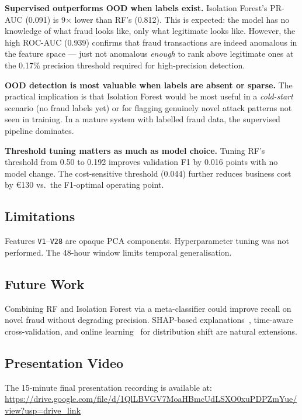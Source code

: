 \documentclass[conference]{IEEEtran}
\begin{document}
\textbf{Supervised outperforms OOD when labels exist.}
Isolation Forest's PR-AUC (0.091) is 9$\times$ lower than RF's (0.812).
This is expected: the model has no knowledge of what fraud looks like, only
what legitimate looks like. However, the high ROC-AUC (0.939) confirms that
fraud transactions are indeed anomalous in the feature space --- just not
anomalous \textit{enough} to rank above legitimate ones at the 0.17\% precision
threshold required for high-precision detection.

\textbf{OOD detection is most valuable when labels are absent or sparse.}
The practical implication is that Isolation Forest would be most useful in a
\textit{cold-start} scenario (no fraud labels yet) or for flagging genuinely
novel attack patterns not seen in training. In a mature system with labelled
fraud data, the supervised pipeline dominates.

\textbf{Threshold tuning matters as much as model choice.}
Tuning RF's threshold from 0.50 to 0.192 improves validation F1 by 0.016
points with no model change. The cost-sensitive threshold (0.044) further
reduces business cost by \euro130 vs.\ the F1-optimal operating point.

\subsection{Limitations}

Features \texttt{V1}--\texttt{V28} are opaque PCA components. Hyperparameter
tuning was not performed. The 48-hour window limits temporal generalisation.

\subsection{Future Work}

Combining RF and Isolation Forest via a meta-classifier could improve recall
on novel fraud without degrading precision. SHAP-based
explanations~\cite{lundberg2017unified}, time-aware cross-validation, and
online learning~\cite{pozzolo2014} for distribution shift are natural extensions.

\subsection{Presentation Video}
The 15-minute final presentation recording is available at:\\
\url{https://drive.google.com/file/d/1QlLBVGV7MoaHBmcUdLSXO0xuPDPZmYue/view?usp=drive_link}
\end{document}

